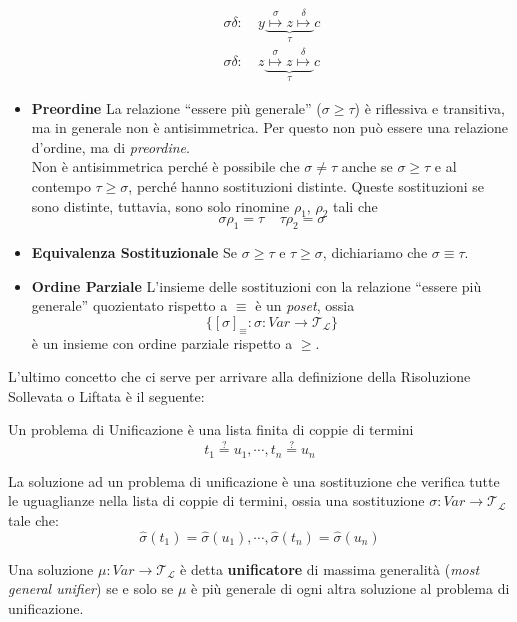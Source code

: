 \begin{itemize}
\begin{align*}
    \sigma\delta: &\ y \underbrace{\stackrel \sigma \mapsto z \stackrel \delta \mapsto}_{\tau} c \\
    \sigma\delta: &\ z \underbrace{\stackrel \sigma \mapsto z \stackrel \delta \mapsto}_{\tau} c
    \end{align*}
  \item{\textbf{Preordine}} La relazione ``essere più generale'' ($\sigma \geq \tau$) è riflessiva e transitiva, ma in generale non è antisimmetrica. Per questo non può essere una relazione d'ordine, ma di \textit{preordine}. \\
    Non è antisimmetrica perché è possibile che $\sigma \neq \tau$ anche se $\sigma \geq \tau$ e al contempo $\tau \geq \sigma$, perché hanno sostituzioni distinte. Queste sostituzioni se sono distinte, tuttavia, sono solo rinomine $\rho_1$, $\rho_2$ tali che 
    $$
    \sigma\rho_1 = \tau ~~~~~ \tau\rho_2 = \sigma
    $$
  \item{\textbf{Equivalenza Sostituzionale}} Se $\sigma \geq \tau$ e $\tau \geq \sigma$, dichiariamo che $\sigma \equiv \tau$.

  \item{\textbf{Ordine Parziale}} L'insieme delle sostituzioni con la relazione ``essere più generale'' quozientato rispetto a $\equiv$ è un \textit{poset}, ossia
  $$
  \{[\sigma]_{\equiv}: \sigma : Var \rightarrow \mathscr{T_L}\} 
  $$
  è un insieme con ordine parziale rispetto a $\geq$.
\end{itemize}

L'ultimo concetto che ci serve per arrivare alla definizione della Risoluzione 
Sollevata o Liftata è il seguente: 
\begin{defi}[Unificazione]
        Un problema di Unificazione è una lista finita di coppie di termini 
        $$
        t_1 \stackrel{?}{=} u_1, \cdots, t_n \stackrel{?}{=} u_n
        $$
\end{defi}
La soluzione ad un problema di unificazione è una sostituzione che verifica tutte 
le uguaglianze nella lista di coppie di termini, ossia una sostituzione $\sigma: Var \rightarrow \mathscr{T_L}$ tale che:
$$
\hat{\sigma}(t_1) = \hat{\sigma}(u_1), \cdots, \hat{\sigma}(t_n) = \hat{\sigma}(u_n)
$$
\begin{defi}[Unificatore]
  Una soluzione $\mu: Var \rightarrow \mathscr{T_L}$ è detta \textbf{unificatore} di massima generalità (\textit{most general unifier}) se e solo se $\mu$ è più generale di ogni altra soluzione al problema di unificazione.
\end{defi}

